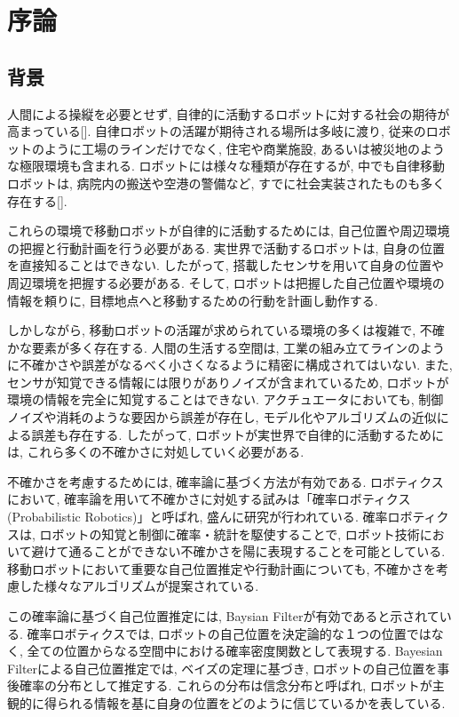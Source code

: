 \chapter{序論} \label{chapter:introduction}


\section{背景} \label{section:backglound}

人間による操縦を必要とせず, 自律的に活動するロボットに対する社会の期待が高まっている[]. 
自律ロボットの活躍が期待される場所は多岐に渡り, 従来のロボットのように工場のラインだけでなく, 住宅や商業施設, あるいは被災地のような極限環境も含まれる. 
ロボットには様々な種類が存在するが, 中でも自律移動ロボットは, 病院内の搬送や空港の警備など, すでに社会実装されたものも多く存在する[]. 

これらの環境で移動ロボットが自律的に活動するためには, 自己位置や周辺環境の把握と行動計画を行う必要がある. 
実世界で活動するロボットは, 自身の位置を直接知ることはできない. 
したがって, 搭載したセンサを用いて自身の位置や周辺環境を把握する必要がある. 
そして, ロボットは把握した自己位置や環境の情報を頼りに, 目標地点へと移動するための行動を計画し動作する. 

しかしながら, 移動ロボットの活躍が求められている環境の多くは複雑で, 不確かな要素が多く存在する. 
人間の生活する空間は, 工業の組み立てラインのように不確かさや誤差がなるべく小さくなるように精密に構成されてはいない. 
また, センサが知覚できる情報には限りがありノイズが含まれているため, ロボットが環境の情報を完全に知覚することはできない. 
アクチュエータにおいても, 制御ノイズや消耗のような要因から誤差が存在し, モデル化やアルゴリズムの近似による誤差も存在する. 
したがって, ロボットが実世界で自律的に活動するためには, これら多くの不確かさに対処していく必要がある. 

不確かさを考慮するためには, 確率論に基づく方法が有効である. 
ロボティクスにおいて, 確率論を用いて不確かさに対処する試みは「確率ロボティクス(Probabilistic Robotics)」と呼ばれ, 盛んに研究が行われている\cite{thrun2005,上田2007prob}. 
確率ロボティクスは, ロボットの知覚と制御に確率・統計を駆使することで, ロボット技術において避けて通ることができない不確かさを陽に表現することを可能としている. 
移動ロボットにおいて重要な自己位置推定や行動計画についても, 不確かさを考慮した様々なアルゴリズムが提案されている. 

この確率論に基づく自己位置推定には, Baysian Filterが有効であると示されている. 
確率ロボティクスでは, ロボットの自己位置を決定論的な１つの位置ではなく, 全ての位置からなる空間中における確率密度関数として表現する. 
Bayesian Filterによる自己位置推定では, ベイズの定理に基づき, ロボットの自己位置を事後確率の分布として推定する. 
これらの分布は信念分布と呼ばれ, ロボットが主観的に得られる情報を基に自身の位置をどのように信じているかを表している. 


